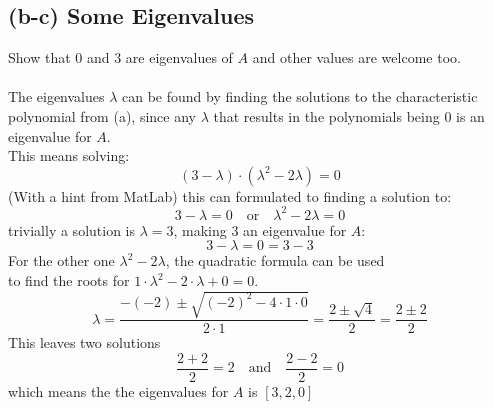 \documentclass[12pt]{article}
\begin{document}
\subsection*{(b-c) Some Eigenvalues}
Show that $0$ and $3$ are eigenvalues of $A$ and other values are welcome too.\\\\
The eigenvalues $\lambda$ can be found by finding the solutions to the characteristic polynomial from (a), since any $\lambda$ that results in the polynomials being 0 is an eigenvalue for $A$.\\
This means solving:
\begin{equation*}
    (3-\lambda) \cdot (\lambda^2 - 2\lambda) = 0
\end{equation*}
(With a hint from MatLab)  this can formulated to finding a solution to:
\begin{equation*}
    3-\lambda = 0 \quad \text{or} \quad \lambda^2 - 2\lambda = 0
\end{equation*}
trivially a solution is $\lambda = 3$, making 3 an eigenvalue for $A$:
\begin{equation*}
    3 - \lambda = 0 = 3 - 3
\end{equation*}
For the other one $\lambda^2 - 2\lambda$, the quadratic formula can be used\\
 to find the roots for $1 \cdot \lambda^2 - 2 \cdot \lambda + 0 = 0 $.
 \begin{equation*}
    \lambda = \frac{-(-2) \pm \sqrt{(-2)^2 - 4 \cdot 1 \cdot 0}}{2 \cdot 1} = \frac{2 \pm \sqrt{4}}{2} = \frac{2 \pm 2}{2}
 \end{equation*}
This leaves two solutions
\begin{equation*}
    \frac{2 + 2}{2} = 2 \quad  \text{and} \quad \frac{2 - 2}{2} = 0
\end{equation*}
which means the the eigenvalues for $A$ is $ [3,2,0]$
\end{document}
